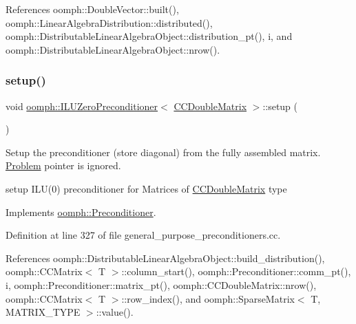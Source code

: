 References oomph\+::\+Double\+Vector\+::built(), oomph\+::\+Linear\+Algebra\+Distribution\+::distributed(), oomph\+::\+Distributable\+Linear\+Algebra\+Object\+::distribution\+\_\+pt(), i, and oomph\+::\+Distributable\+Linear\+Algebra\+Object\+::nrow().

\mbox{\label{classoomph_1_1ILUZeroPreconditioner_3_01CCDoubleMatrix_01_4_ab72053725965ff961b01d6dc6d77c819}} 
\subsubsection{\texorpdfstring{setup()}{setup()}}
{\footnotesize\ttfamily void \hyperlink{classoomph_1_1ILUZeroPreconditioner}{oomph\+::\+I\+L\+U\+Zero\+Preconditioner}$<$ \hyperlink{classoomph_1_1CCDoubleMatrix}{C\+C\+Double\+Matrix} $>$\+::setup (\begin{DoxyParamCaption}{ }\end{DoxyParamCaption})\hspace{0.3cm}{\ttfamily [virtual]}}



Setup the preconditioner (store diagonal) from the fully assembled matrix. \hyperlink{classoomph_1_1Problem}{Problem} pointer is ignored. 

setup I\+L\+U(0) preconditioner for Matrices of \hyperlink{classoomph_1_1CCDoubleMatrix}{C\+C\+Double\+Matrix} type 

Implements \hyperlink{classoomph_1_1Preconditioner_af4886f4efe510e5c9b0eb19422943588}{oomph\+::\+Preconditioner}.



Definition at line 327 of file general\+\_\+purpose\+\_\+preconditioners.\+cc.



References oomph\+::\+Distributable\+Linear\+Algebra\+Object\+::build\+\_\+distribution(), oomph\+::\+C\+C\+Matrix$<$ T $>$\+::column\+\_\+start(), oomph\+::\+Preconditioner\+::comm\+\_\+pt(), i, oomph\+::\+Preconditioner\+::matrix\+\_\+pt(), oomph\+::\+C\+C\+Double\+Matrix\+::nrow(), oomph\+::\+C\+C\+Matrix$<$ T $>$\+::row\+\_\+index(), and oomph\+::\+Sparse\+Matrix$<$ T, M\+A\+T\+R\+I\+X\+\_\+\+T\+Y\+P\+E $>$\+::value().



